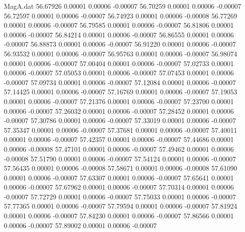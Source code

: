 \begin{filecontents}{MagA.dat}
  56.67926    0.00001    0.00006   -0.00007
  56.70259    0.00001    0.00006   -0.00007
  56.72597    0.00001    0.00006   -0.00007
  56.74923    0.00001    0.00006   -0.00008
  56.77269    0.00001    0.00006   -0.00007
  56.79585    0.00001    0.00006   -0.00007
  56.81806    0.00001    0.00006   -0.00007
  56.84214    0.00001    0.00006   -0.00007
  56.86555    0.00001    0.00006   -0.00007
  56.88873    0.00001    0.00006   -0.00007
  56.91220    0.00001    0.00006   -0.00007
  56.93532    0.00001    0.00006   -0.00007
  56.95763    0.00001    0.00006   -0.00007
  56.98074    0.00001    0.00006   -0.00007
  57.00404    0.00001    0.00006   -0.00007
  57.02733    0.00001    0.00006   -0.00007
  57.05053    0.00001    0.00006   -0.00007
  57.07453    0.00001    0.00006   -0.00007
  57.09734    0.00001    0.00006   -0.00007
  57.12084    0.00001    0.00006   -0.00007
  57.14425    0.00001    0.00006   -0.00007
  57.16769    0.00001    0.00006   -0.00007
  57.19053    0.00001    0.00006   -0.00007
  57.21376    0.00001    0.00006   -0.00007
  57.23700    0.00001    0.00006   -0.00007
  57.26032    0.00001    0.00006   -0.00007
  57.28452    0.00001    0.00006   -0.00007
  57.30786    0.00001    0.00006   -0.00007
  57.33019    0.00001    0.00006   -0.00007
  57.35347    0.00001    0.00006   -0.00007
  57.37681    0.00001    0.00006   -0.00007
  57.40011    0.00001    0.00006   -0.00007
  57.42357    0.00001    0.00006   -0.00007
  57.44686    0.00001    0.00006   -0.00008
  57.47101    0.00001    0.00006   -0.00007
  57.49462    0.00001    0.00006   -0.00008
  57.51790    0.00001    0.00006   -0.00007
  57.54124    0.00001    0.00006   -0.00007
  57.56435    0.00001    0.00006   -0.00008
  57.58671    0.00001    0.00006   -0.00008
  57.61090    0.00001    0.00006   -0.00007
  57.63307    0.00001    0.00006   -0.00007
  57.65641    0.00001    0.00006   -0.00007
  57.67962    0.00001    0.00006   -0.00007
  57.70314    0.00001    0.00006   -0.00007
  57.72729    0.00001    0.00006   -0.00007
  57.75033    0.00001    0.00006   -0.00007
  57.77365    0.00001    0.00006   -0.00007
  57.79594    0.00001    0.00006   -0.00007
  57.81924    0.00001    0.00006   -0.00007
  57.84230    0.00001    0.00006   -0.00007
  57.86566    0.00001    0.00006   -0.00007
  57.89002    0.00001    0.00006   -0.00007
\end{filecontents}
